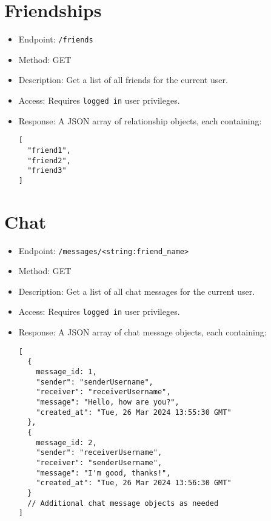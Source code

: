 \documentclass[12pt]{article}
\begin{document}
\section{Friendships}
\begin{itemize}
    \item Endpoint: \texttt{/friends}
    \item Method: GET
    \item Description: Get a list of all friends for the current user.
    \item Access: Requires \texttt{logged in} user privileges.
    \item Response: A JSON array of relationship objects, each containing:
    \begin{verbatim}
[
  "friend1",
  "friend2",
  "friend3"
]
    \end{verbatim}
\end{itemize}

\section{Chat}
\begin{itemize}
    \item Endpoint: \texttt{/messages/<string:friend\_name>}
    \item Method: GET
    \item Description: Get a list of all chat messages for the current user.
    \item Access: Requires \texttt{logged in} user privileges.
    \item Response: A JSON array of chat message objects, each containing:
    \begin{verbatim}
[
  {
    message_id: 1,
    "sender": "senderUsername",
    "receiver": "receiverUsername",
    "message": "Hello, how are you?",
    "created_at": "Tue, 26 Mar 2024 13:55:30 GMT"
  },
  {
    message_id: 2,
    "sender": "receiverUsername",
    "receiver": "senderUsername",
    "message": "I'm good, thanks!",
    "created_at": "Tue, 26 Mar 2024 13:56:30 GMT"
  }
  // Additional chat message objects as needed
]
    \end{verbatim}
\end{itemize}
\end{document}
